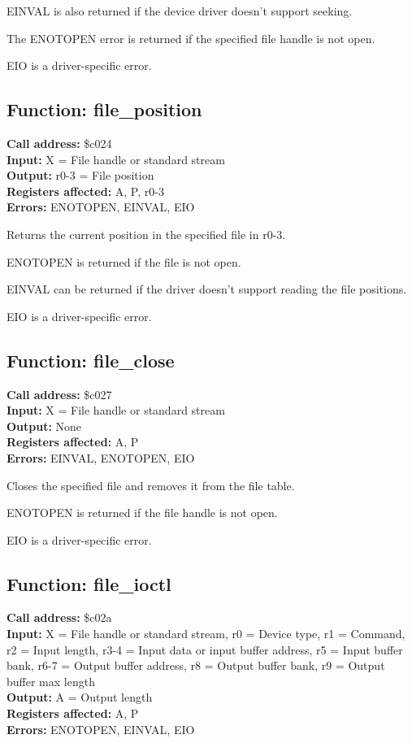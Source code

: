 EINVAL is also returned if the device driver doesn't support
seeking.

The ENOTOPEN error is returned if the specified file handle is not open.

EIO is a driver-specific error.


\subsection{Function: file\_position}

\textbf{Call address:} \$c024\\
\textbf{Input:} X = File handle or standard stream \\
\textbf{Output:} r0-3 = File position \\
\textbf{Registers affected:} A, P, r0-3 \\
\textbf{Errors:} ENOTOPEN, EINVAL, EIO

Returns the current position in the specified file in r0-3.

ENOTOPEN is returned if the file is not open.

EINVAL can be returned if the driver doesn't support
reading the file positions.

EIO is a driver-specific error.


\subsection{Function: file\_close}

\textbf{Call address:} \$c027\\
\textbf{Input:} X = File handle or standard stream \\
\textbf{Output:} None \\
\textbf{Registers affected:} A, P \\
\textbf{Errors:} EINVAL, ENOTOPEN, EIO

Closes the specified file and removes it from the file table.

ENOTOPEN is returned if the file handle is not open.

EIO is a driver-specific error.


\subsection{Function: file\_ioctl}

\textbf{Call address:} \$c02a\\
\textbf{Input:} X = File handle or standard stream, r0 = Device type, r1 = Command, r2 = Input length, r3-4 = Input data or input buffer address, r5 = Input buffer bank,
r6-7 = Output buffer address, r8 = Output buffer bank, r9 = Output buffer max length \\
\textbf{Output:} A = Output length \\
\textbf{Registers affected:} A, P \\
\textbf{Errors:} ENOTOPEN, EINVAL, EIO

